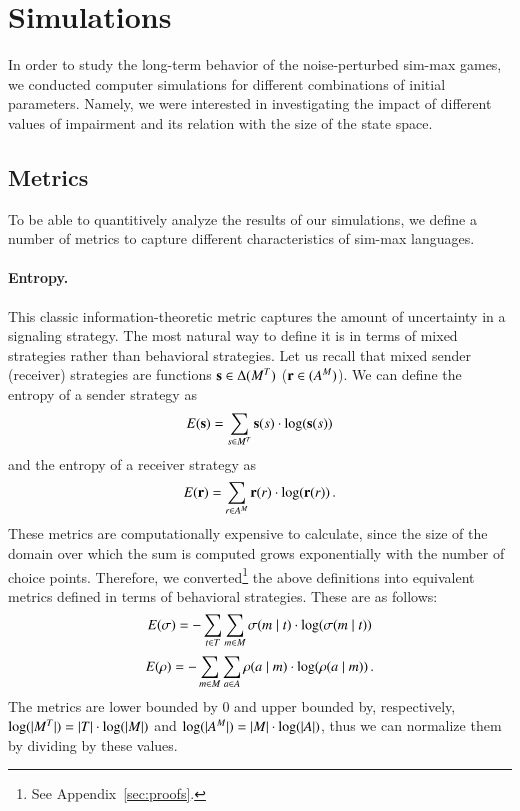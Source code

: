 \section{Simulations}

In order to study the long-term behavior of the noise-perturbed sim-max games, we conducted computer simulations for different combinations of initial parameters.
Namely, we were interested in investigating the impact of different values of impairment and its relation with the size of the state space.

\subsection{Metrics}
\label{sec:metrics}
To be able to quantitively analyze the results of our simulations, we define a number of metrics to capture different characteristics of sim-max languages.

\paragraph{Entropy.}
This classic information-theoretic metric captures the amount of uncertainty in a signaling strategy.
The most natural way to define it is in terms of mixed strategies rather than behavioral strategies.
Let us recall that mixed sender (receiver) strategies are functions $\mathrm{\mathbf{s}} \in \Delta(M^T)$ ($\mathrm{\mathbf{r}} \in (A^M)$).
We can define the entropy of a sender strategy as
\begin{align*}
  E(\mathrm{\mathbf{s}}) = \sum_{s \in M^T} \mathrm{\mathbf{s}}(s) \cdot \log(\mathrm{\mathbf{s}}(s))
\end{align*} 
and the entropy of a receiver strategy as
\begin{align*}
  E(\mathrm{\mathbf{r}}) = \sum_{r \in A^M} \mathrm{\mathbf{r}}(r) \cdot \log(\mathrm{\mathbf{r}}(r)) \,.
\end{align*} 
These metrics are computationally expensive to calculate, since the size of the domain over which the sum is computed grows exponentially with the number of choice points.
Therefore, we converted\footnote{See Appendix~\ref{sec:proofs}.} the above definitions into equivalent metrics defined in terms of behavioral strategies.
These are as follows:
\begin{align*}
  E(\sigma) = -\sum_{t \in T} \sum_{m \in M} \sigma(m \mid t) \cdot \log(\sigma(m \mid t))
\end{align*} 
\begin{align*}
  E(\rho) = -\sum_{m \in M} \sum_{a \in A} \rho(a \mid m) \cdot \log(\rho(a \mid m)) \,.
\end{align*}
The metrics are lower bounded by $0$ and upper bounded by, respectively, $\log(|M^T|) = |T| \cdot \log(|M|)$ and $\log(|A^M|) = |M| \cdot \log(|A|)$, thus we can normalize them by dividing by these values.

